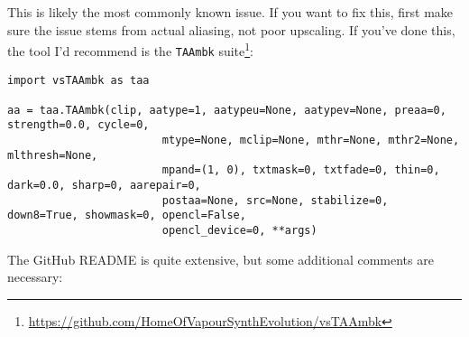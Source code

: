 \documentclass{scrartcl}
\begin{document}
This is likely the most commonly known issue.  If you want to fix this, first make sure the issue stems from actual aliasing, not poor upscaling.  If you've done this, the tool I'd recommend is the \texttt{TAAmbk} suite\footnote{\url{https://github.com/HomeOfVapourSynthEvolution/vsTAAmbk}}:
\begin{lstlisting}
import vsTAAmbk as taa

aa = taa.TAAmbk(clip, aatype=1, aatypeu=None, aatypev=None, preaa=0, strength=0.0, cycle=0,
						mtype=None, mclip=None, mthr=None, mthr2=None, mlthresh=None, 
						mpand=(1, 0), txtmask=0, txtfade=0, thin=0, dark=0.0, sharp=0, aarepair=0, 
						postaa=None, src=None, stabilize=0, down8=True, showmask=0, opencl=False, 
						opencl_device=0, **args)
\end{lstlisting}
The GitHub README is quite extensive, but some additional comments are necessary:
\end{document}
